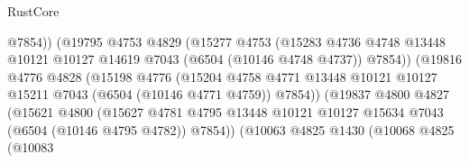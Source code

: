 \begin{lexlean}{RustCore}
\begin{coremodule}
                                        @7854))
                                    (@19795
                                      @4753
                                      @4829
                                      (@15277
                                        @4753
                                        (@15283
                                          @4736
                                          @4748
                                          @13448
                                          @10121
                                          @10127
                                          @14619
                                          @7043
                                          (@6504 (@10146 @4748 @4737))
                                          @7854))
                                      (@19816
                                        @4776
                                        @4828
                                        (@15198
                                          @4776
                                          (@15204
                                            @4758
                                            @4771
                                            @13448
                                            @10121
                                            @10127
                                            @15211
                                            @7043
                                            (@6504 (@10146 @4771 @4759))
                                            @7854))
                                        (@19837
                                          @4800
                                          @4827
                                          (@15621
                                            @4800
                                            (@15627
                                              @4781
                                              @4795
                                              @13448
                                              @10121
                                              @10127
                                              @15634
                                              @7043
                                              (@6504 (@10146 @4795 @4782))
                                              @7854))
                                          (@10063
                                            @4825
                                            @1430
                                            (@10068
                                              @4825
                                              (@10083

\end{coremodule}
\end{lexlean}
